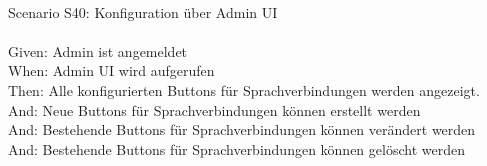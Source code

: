 \begin{tabbing}
    \\
    Scenario S40: \> \> \> Konfiguration über Admin UI \\ \\
    Given: \> \> \>  Admin ist angemeldet\\
    When: \> \> \>  Admin UI wird aufgerufen\\
    Then: \> \> \>  Alle konfigurierten Buttons für Sprachverbindungen werden angezeigt.\\
    And: \> \> \>  Neue Buttons für Sprachverbindungen können erstellt werden\\
    And: \> \> \>  Bestehende Buttons für Sprachverbindungen können verändert werden\\
    And: \> \> \>  Bestehende Buttons für Sprachverbindungen können gelöscht werden\\
    \\
\end{tabbing}
\clearpage
